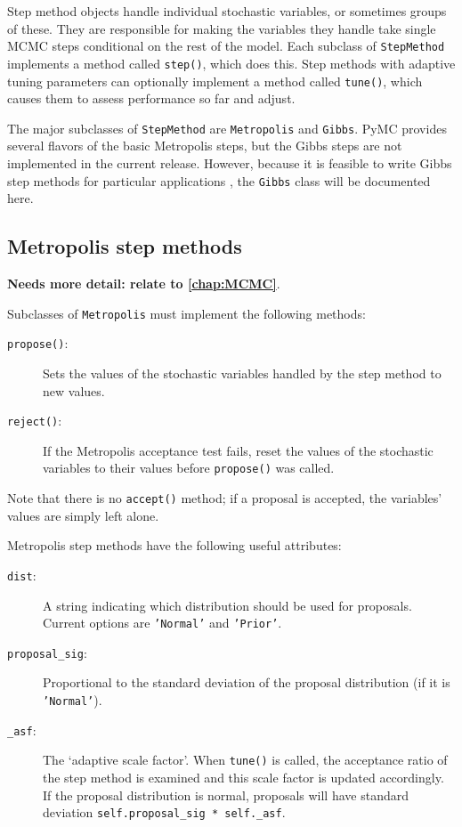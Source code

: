 Step method objects handle individual stochastic variables, or sometimes groups of these. They are responsible for making the variables they handle take single MCMC steps conditional on the rest of the model. Each subclass of \texttt{StepMethod} implements a method called \texttt{step()}, which does this. Step methods with adaptive tuning parameters can optionally implement a method called \texttt{tune()}, which causes them to assess performance so far and adjust.

The major subclasses of \texttt{StepMethod} are \texttt{Metropolis} and \texttt{Gibbs}. PyMC provides several flavors of the basic Metropolis steps, but the Gibbs steps are not implemented in the current release. However, because it is feasible to write Gibbs step methods for particular applications , the \texttt{Gibbs} class will be documented here.


\subsection{Metropolis step methods}
\textbf{Needs more detail: relate to \ref{chap:MCMC}}.

Subclasses of \texttt{Metropolis} must implement the following methods:
\begin{description}
    \item[\texttt{propose()}:] Sets the values of the stochastic variables handled by the step method to new values.
    \item[\texttt{reject()}:] If the Metropolis acceptance test fails, reset the values of the stochastic variables to their values before \texttt{propose()} was called.
\end{description}
Note that there is no \texttt{accept()} method; if a proposal is accepted, the variables' values are simply left alone.

Metropolis step methods have the following useful attributes:
\begin{description}
    \item[\texttt{dist}:] A string indicating which distribution should be used for proposals. Current options are \texttt{'Normal'} and \texttt{'Prior'}.
    \item[\texttt{proposal\_sig}:] Proportional to the standard deviation of the proposal distribution (if it is \texttt{'Normal'}).
    \item[\texttt{\_asf}:] The `adaptive scale factor'. When \texttt{tune()} is called, the acceptance ratio of the step method is examined and this scale factor is updated accordingly. If the proposal distribution is normal, proposals will have standard deviation \texttt{self.proposal\_sig * self.\_asf}. 
\end{description}

